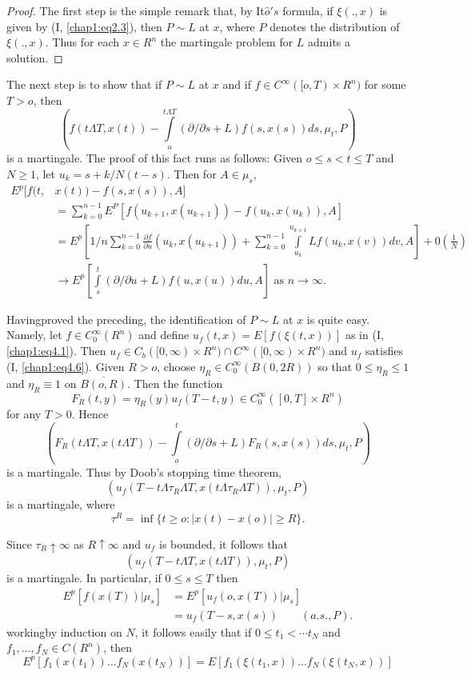 \begin{proof}
The first step is the simple remark that, by It$\hat{o}'s$ formula,
if $\xi (.,x)$ is given by (I, \ref{chap1:eq2.3}), then $P \sim L$ at $x$, where
$P$ denotes the distribution of $\xi (.,x)$. Thus for each $x \in R^n$
the martingale problem for $L$ admits a solution. 
\end{proof}

The next step is to show that if $P \sim L $ at $x$ and if $f \in
C^\infty ([o,T) \times R^n)$ for some $T > o$, then 
$$
(f (t \Lambda T, x(t)) - \int \limits^{t \Lambda T}_{o} (\partial/
  \partial s + L)f(s,x(s))ds, \mu_t,P) 
$$
is a martingale. The proof of this fact runs as follows: 
Given $o \leq s < t \leq T$ and $N \geq 1$, let $u_k =
s+k/N(t-s)$. Then for $A \in \mu_s$, 
{\fontsize{10pt}{12pt}\selectfont
\begin{align*}
 E^p[f(t, & x(t))- f(s,x(s)), A]\\
 & = \sum^{n-1}_{k=0}E^P[f(u_{k+1}, x(u_{k+1})) -f(u_k, x(u_k)),A]\\ 
 & = E^p [1/n \sum^{n-1}_{k=0} \frac{\partial f}{ \partial u}(u_k, x
   (u_{k+1}))+\sum^{n-1}_{k=0} \int \limits^{u_{k+1}}_{u_k} Lf
   (u_k,x(v))dv,A ] + 0\left(\frac{1}{N} \right)\\ 
 & \to E^p [ \int \limits^t_s (\partial / \partial u + L) f(u,x(u))
   du, A]\text{ as } n \to \infty. 
\end{align*}}\relax

Having\pageoriginale proved the preceding, the identification of $P
\sim L$ at $x$ 
is quite easy. Namely, let $f \in C^\infty_0(R^n)$ and define 
$u_f (t,x)= E[f(\xi (t,x))]$ as in (I, \ref{chap1:eq4.1}). Then
$u_f \in C_b([0, \infty) \times R^n) \cap C^\infty ([0, \infty) \times
    R^n)$ and $u_f$ satisfies (I, \ref{chap1:eq4.6}). 
Given $R > o$, choose $\eta _R \in C^\infty_0 (B(0,2R))$ so that $0
\leq \eta_R \leq 1$ and $\eta_R \equiv 1$ on $\overline{B(o,R)}$. Then
the function 
$$
F_R(t,y)= \eta_R(y) u_f (T-t,y) \in C^\infty _0 ([0,T]\times R^n)
$$
for any $T > 0$. Hence
$$
(F_R(t \Lambda T, x(t \Lambda T)) - \int \limits^t_o (\partial /
\partial s + L) F_R(s,x(s))ds, \mu_t,P) 
$$
is a martingale. Thus by Doob's stopping time theorem,
$$
(u_f(T-t \Lambda \tau_R \Lambda T, x(t \Lambda \tau_R \Lambda T)), \mu_t
, P) 
$$
is a martingale, where 
$$
\tau^R = \inf \{ t \geq o : | x(t) - x(o)| \geq R \}. 
$$

Since $\tau_R \uparrow \infty$ as $R \uparrow \infty$ and $u_f$ is
bounded, it follows that  
$$
(u_f(T-t \Lambda T, x(t \Lambda  T)), \mu_t , P)
$$
is a martingale. In particular, if $0 \leq s \leq T$ then 
\begin{align*}
E^p[f (x(T)) | \mu_s] & = E^p[u_f (o, x(T))| \mu_s]\\
& = u_f (T -s, x(s)) \qquad (a.s., P).
\end{align*}
working\pageoriginale by induction on $N$, it follows easily that if 
$0 \leq t_1 < \cdots t_N$ and $f_1, \ldots ,f_N \in C(R^n)$, then
$$
E^p[ f_1 (x(t_1)) \ldots f_N (x(t_N))]= E[ f_1 (\xi(t_1,x)) \ldots f_N
  (\xi(t_N,x))] 
$$ 

